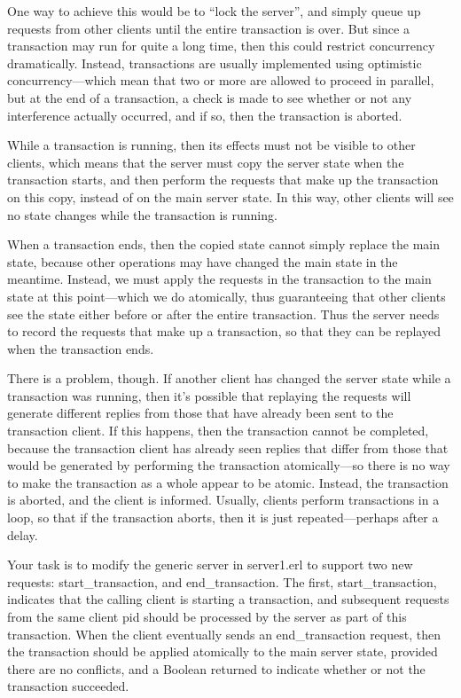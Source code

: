 \documentclass{article}
\begin{document}
One way to achieve this would be to “lock the server”, and simply
queue up requests from other clients until the entire transaction is
over.  But since a transaction may run for quite a long time, then
this could restrict concurrency dramatically. Instead, transactions
are usually implemented using optimistic concurrency—which mean that
two or more are allowed to proceed in parallel, but at the end of a
transaction, a check is made to see whether or not any interference
actually occurred, and if so, then the transaction is aborted.

While a transaction is running, then its effects must not be visible
to other clients, which means that the server must copy the server
state when the transaction starts, and then perform the requests that
make up the transaction on this copy, instead of on the main server
state. In this way, other clients will see no state changes while the
transaction is running.


When a transaction ends, then the copied state cannot simply replace
the main state, because other operations may have changed the main
state in the meantime. Instead, we must apply the requests in the
transaction to the main state at this point—which we do atomically,
thus guaranteeing that other clients see the state either before or
after the entire transaction.  Thus the server needs to record the
requests that make up a transaction, so that they can be replayed when
the transaction ends.

There is a problem, though. If another client has changed the server
state while a transaction was running, then it’s possible that
replaying the requests will generate different replies from those that
have already been sent to the transaction client. If this happens,
then the transaction cannot be completed, because the transaction
client has already seen replies that differ from those that would be
generated by performing the transaction atomically—so there is no way
to make the transaction as a whole appear to be atomic. Instead, the
transaction is aborted, and the client is informed. Usually, clients
perform transactions in a loop, so that if the transaction aborts,
then it is just repeated—perhaps after a delay.

Your task is to modify the generic server in \textsf{server1.erl} to support
two new requests: \textsf{start\_transaction}, and
\textsf{end\_transaction}. The first, \textsf{start\_transaction},
indicates that the calling client is starting a transaction, and
subsequent requests from the same client pid should be processed by
the server as part of this transaction. When the client eventually
sends an \textsf{end\_transaction} request, then the transaction
should be applied atomically to the main server state, provided there
are no conflicts, and a Boolean returned to indicate whether or not
the transaction succeeded.
\end{document}
